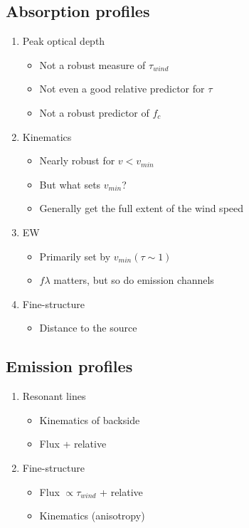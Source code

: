 \documentclass[12pt,preprint]{aastex}
\begin{document}
\subsection{Absorption profiles}

 \begin{enumerate}
   \item Peak optical depth
     \begin{itemize}
       \item Not a robust measure of $\tau_{wind}$
       \item Not even a good relative predictor for $\tau$
       \item Not a robust predictor of $f_c$
     \end{itemize}
   \item Kinematics
     \begin{itemize}
       \item Nearly robust for $v<v_{min}$
       \item But what sets $v_{min}$?
       \item Generally get the full extent of the wind speed
     \end{itemize}
   \item EW
     \begin{itemize}
       \item Primarily set by $v_{min}(\tau \sim 1)$
       \item $f\lambda$ matters, but so do emission channels
     \end{itemize}
   \item Fine-structure
     \begin{itemize}
       \item Distance to the source
     \end{itemize}
 \end{enumerate}
     
\subsection{Emission profiles}

 \begin{enumerate}
   \item Resonant lines
     \begin{itemize}
       \item Kinematics of backside
       \item Flux + relative
    \end{itemize}
   \item Fine-structure
     \begin{itemize}
       \item Flux $\propto \tau_{wind}$ + relative
       \item Kinematics (anisotropy)
    \end{itemize}
 \end{enumerate}
     
\end{document}
